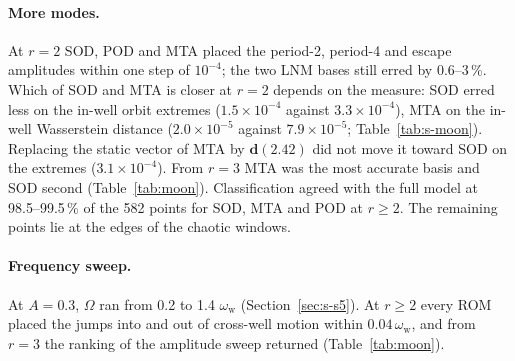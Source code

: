 \documentclass[preprint,12pt]{elsarticle}
\begin{document}
\paragraph{More modes.} At $r=2$ SOD, POD and MTA placed the period-2, period-4 and escape amplitudes within one step of $10^{-4}$; the two LNM bases still erred by 0.6--3\,\%. Which of SOD and MTA is closer at $r=2$ depends on the measure: SOD erred less on the in-well orbit extremes ($1.5\times10^{-4}$ against $3.3\times10^{-4}$), MTA on the in-well Wasserstein distance ($2.0\times10^{-5}$ against $7.9\times10^{-5}$; Table~\ref{tab:s-moon}). Replacing the static vector of MTA by $\bm{d}(2.42)$ did not move it toward SOD on the extremes ($3.1\times10^{-4}$). From $r=3$ MTA was the most accurate basis and SOD second (Table~\ref{tab:moon}). Classification agreed with the full model at 98.5--99.5\,\% of the 582 points for SOD, MTA and POD at $r\ge2$. The remaining points lie at the edges of the chaotic windows.

\paragraph{Frequency sweep.} At $A=0.3$, $\varOmega$ ran from 0.2 to 1.4 $\omega_{\mathrm w}$ (Section~\ref{sec:s-s5}). At $r\ge2$ every ROM placed the jumps into and out of cross-well motion within $0.04\,\omega_{\mathrm w}$, and from $r=3$ the ranking of the amplitude sweep returned (Table~\ref{tab:moon}).
\end{document}
